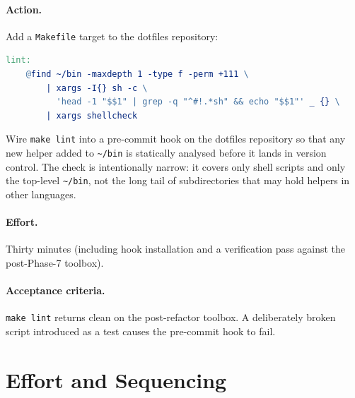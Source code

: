 \documentclass[11pt,letterpaper]{scrartcl}
\begin{document}
\paragraph{Action.} Add a \texttt{Makefile} target to the
dotfiles repository:

\begin{lstlisting}[language=make]
lint:
	@find ~/bin -maxdepth 1 -type f -perm +111 \
	    | xargs -I{} sh -c \
	      'head -1 "$$1" | grep -q "^#!.*sh" && echo "$$1"' _ {} \
	    | xargs shellcheck
\end{lstlisting}

Wire \texttt{make lint} into a pre-commit hook on the dotfiles
repository so that any new helper added to
\texttt{\textasciitilde/bin} is statically analysed before it
lands in version control. The check is intentionally narrow: it
covers only shell scripts and only the top-level
\texttt{\textasciitilde/bin}, not the long tail of subdirectories
that may hold helpers in other languages.

\paragraph{Effort.} Thirty minutes (including hook installation
and a verification pass against the post-Phase-7 toolbox).

\paragraph{Acceptance criteria.} \texttt{make lint} returns clean
on the post-refactor toolbox. A deliberately broken script
introduced as a test causes the pre-commit hook to fail.

\section{Effort and Sequencing}
\end{document}
